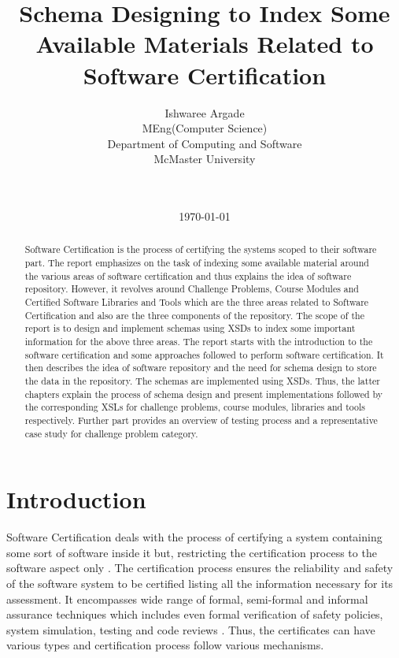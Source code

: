 \documentclass[11pt,letterpaper]{report}
\title{Schema Designing to Index Some Available Materials Related to Software Certification}
\author{
        \normalsize
        Ishwaree Argade
            \mbox{}\\ %
        \normalsize MEng(Computer Science)
         \mbox{} \\
       \normalsize Department of Computing and Software 
                \mbox{}\\ %
        \normalsize McMaster University 
        \mbox{} \\
        \date{\today} \\
}
\begin{document}
\maketitle

\begin{abstract}

Software Certification is the process of certifying the systems scoped to their software part. The report emphasizes on the task of indexing some available material around the various areas of software certification and thus explains the idea of software repository. However, it revolves around Challenge Problems, Course Modules and Certified Software Libraries and Tools which are the three areas related to Software Certification and also are the three components of the repository. The scope of the report is to design and implement schemas using XSDs to index some important information for the above three areas. The report starts with the introduction to the software certification and some approaches followed to perform software certification. It then describes the idea of software repository and the need for schema design to store the data in the repository. The schemas are implemented using XSDs. Thus, the latter chapters explain the process of schema design and present implementations followed by the corresponding XSLs for challenge problems, course modules, libraries and tools respectively. Further part provides an overview of testing process and a representative case study for challenge problem category.  
\end{abstract}

\setcounter{tocdepth}{2}
\tableofcontents

\chapter{Introduction}

Software Certification deals with the process of certifying a system containing some sort of software inside it but, restricting the certification process to the software aspect only \cite{seminar}. The certification process ensures the reliability and safety of the software system to be certified listing all the information necessary for its assessment. It encompasses wide range of formal, semi-formal and informal assurance techniques which includes even formal verification of safety policies, system simulation, testing and code reviews \cite{SCMS}. Thus, the certificates can have various types and certification process follow various mechanisms. 
\end{document}
